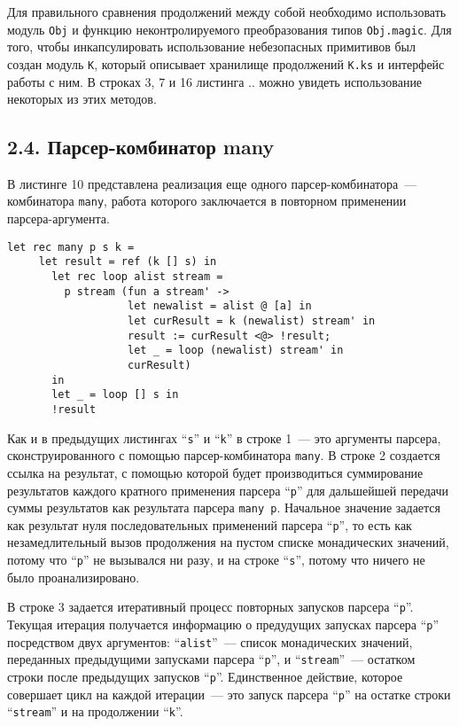 Для правильного сравнения продолжений между собой необходимо использовать модуль \lstinline|Obj| и функцию неконтролируемого преобразования типов \lstinline|Obj.magic|. Для того, чтобы инкапсулировать использование небезопасных примитивов был создан модуль \lstinline|K|, который описывает хранилище продолжений \lstinline|K.ks| и интерфейс работы с ним. В строках 3, 7 и 16 листинга .. можно увидеть использование некоторых из этих методов.

\subsection*{2.4. Парсер-комбинатор many}

В листинге 10 представлена реализация еще одного парсер-комбинатора~--- комбинатора \lstinline|many|, работа которого заключается в повторном применении парсера-аргумента.

\begin{lstlisting}[basicstyle=\small, caption=Парсер-комбинатор many]
   let rec many p s k =
     let result = ref (k [] s) in
       let rec loop alist stream =
         p stream (fun a stream' ->
                   let newalist = alist @ [a] in
                   let curResult = k (newalist) stream' in
                   result := curResult <@> !result;
                   let _ = loop (newalist) stream' in
                   curResult)
       in
       let _ = loop [] s in
       !result
\end{lstlisting}

Как и в предыдущих листингах ``\lstinline|s|'' и ``\lstinline|k|'' в строке 1~--- это аргументы парсера, сконструированного с помощью парсер-комбинатора \lstinline|many|. В строке 2 создается ссылка на результат, с помощью которой будет производиться суммирование результатов каждого кратного применения парсера ``\lstinline|р|'' для дальшейшей передачи суммы результатов как результата парсера \lstinline|many p|. Начальное значение задается как результат нуля последовательных применений парсера ``\lstinline|р|'', то есть как незамедлительный вызов продолжения на пустом списке монадических значений, потому что ``\lstinline|р|'' не вызывался ни разу, и на строке ``\lstinline|s|'', потому что ничего не было проанализировано.

В строке 3 задается итеративный процесс повторных запусков парсера ``\lstinline|р|''. Текущая итерация получается информацию о предудущих запусках парсера ``\lstinline|р|'' посредством двух аргументов: ``\lstinline|alist|''~--- список монадических значений, переданных предыдущими запусками парсера ``\lstinline|p|'', и ``\lstinline|stream|''~--- остатком строки после предыдущих запусков ``\lstinline|p|''. Единственное действие, которое совершает цикл на каждой итерации~--- это запуск парсера ``\lstinline|р|'' на остатке строки ``\lstinline|stream|'' и на продолжении ``\lstinline|k|''.

